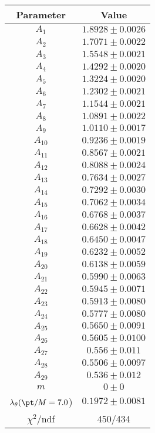 \begin{tabular}{c|c}
Parameter & Value\\
\hline
$A_{1}$ & $1.8928\pm0.0026$ \\
$A_{2}$ & $1.7071\pm0.0022$ \\
$A_{3}$ & $1.5548\pm0.0021$ \\
$A_{4}$ & $1.4292\pm0.0020$ \\
$A_{5}$ & $1.3224\pm0.0020$ \\
$A_{6}$ & $1.2302\pm0.0021$ \\
$A_{7}$ & $1.1544\pm0.0021$ \\
$A_{8}$ & $1.0891\pm0.0022$ \\
$A_{9}$ & $1.0110\pm0.0017$ \\
$A_{10}$ & $0.9236\pm0.0019$ \\
$A_{11}$ & $0.8567\pm0.0021$ \\
$A_{12}$ & $0.8088\pm0.0024$ \\
$A_{13}$ & $0.7634\pm0.0027$ \\
$A_{14}$ & $0.7292\pm0.0030$ \\
$A_{15}$ & $0.7062\pm0.0034$ \\
$A_{16}$ & $0.6768\pm0.0037$ \\
$A_{17}$ & $0.6628\pm0.0042$ \\
$A_{18}$ & $0.6450\pm0.0047$ \\
$A_{19}$ & $0.6232\pm0.0052$ \\
$A_{20}$ & $0.6138\pm0.0059$ \\
$A_{21}$ & $0.5990\pm0.0063$ \\
$A_{22}$ & $0.5945\pm0.0071$ \\
$A_{23}$ & $0.5913\pm0.0080$ \\
$A_{24}$ & $0.5777\pm0.0080$ \\
$A_{25}$ & $0.5650\pm0.0091$ \\
$A_{26}$ & $0.5605\pm0.0100$ \\
$A_{27}$ & $0.556\pm0.011$ \\
$A_{28}$ & $0.5506\pm0.0097$ \\
$A_{29}$ & $0.536\pm0.012$ \\
$m$ & $0\pm0$ \\
$\lambda_\theta(\pt/M = 7.0$) & $0.1972\pm0.0081$ \\
\hline
$\chi^2$/ndf & 450/434
\end{tabular}
